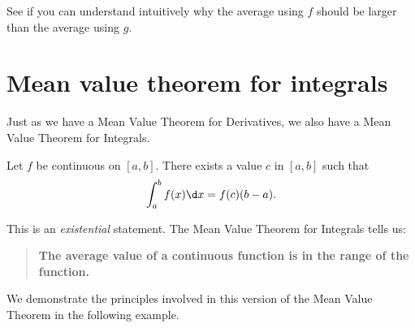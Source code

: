 \documentclass{ximera}
\begin{document}
See if you can understand intuitively why the average using $f$ should
be larger than the average using $g$.  %



\section{Mean value theorem for integrals}

Just as we have a Mean Value Theorem for Derivatives, we also have a
Mean Value Theorem for Integrals.


\begin{theorem}
Let $f$ be continuous on $[a,b]$. There exists a value $c$ in $[a,b]$
such that
\[
\int_a^bf(x)\d x = f(c)(b-a).
\]
\end{theorem}

This is an \emph{existential} statement. The Mean Value Theorem for
Integrals tells us:
\begin{quote}
\textbf{The average value of a continuous function is in the range of
  the function.}
\end{quote}

We demonstrate the principles involved in this version of the Mean
Value Theorem in the following example.
\end{document}

